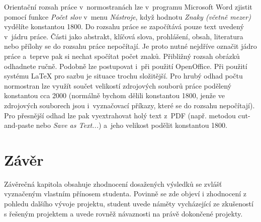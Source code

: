 Orientační rozsah práce v~normostranách lze v~programu Microsoft Word zjistit pomocí funkce {\it Počet slov} v~menu {\it Nástroje}, když hodnotu {\it Znaky (včetně mezer)} vydělíte konstantou 1800. Do rozsahu práce se započítává pouze text uvedený v~jádru práce. Části jako abstrakt, klíčová slova, prohlášení, obsah, literatura nebo přílohy se do rozsahu práce nepočítají. Je proto nutné nejdříve označit jádro práce a~teprve pak si nechat spočítat počet znaků. Přibližný rozsah obrázků odhadnete ručně. Podobně lze postupovat i~při použití OpenOffice. Při použití systému LaTeX pro sazbu je situace trochu složitější. Pro hrubý odhad počtu normostran lze využít součet velikostí zdrojových souborů práce podělený konstantou cca 2000 (normálně bychom dělili konstantou 1800, jenže ve zdrojových souborech jsou i~vyznačovací příkazy, které se do rozsahu nepočítají). Pro přesnější odhad lze pak vyextrahovat holý text z~PDF (např. metodou cut-and-paste nebo {\it Save as Text...}) a~jeho velikost podělit konstantou 1800. 


\chapter{Závěr}
Závěrečná kapitola obsahuje zhodnocení dosažených výsledků se zvlášť vyznačeným vlastním přínosem studenta. Povinně se zde objeví i zhodnocení z pohledu dalšího vývoje projektu, student uvede náměty vycházející ze zkušeností s řešeným projektem a uvede rovněž návaznosti na právě dokončené projekty.


